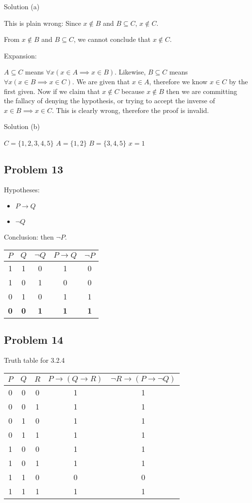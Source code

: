 \documentclass{article}
\begin{document}
Solution (a)

This is plain wrong: Since $x \notin B$ and $B \subseteq C$, $x \notin
C$.

From $x \notin B$ and $B \subseteq C$, we cannot conclude that $x
\notin C$.

Expansion:

$A \subseteq C$ means $\forall x ( x \in A \implies x \in B )$. Likewise,
$B \subseteq C$ means $\forall x ( x \in B \implies x \in C )$. We are given
that $x \in A$, therefore we know $x \in C$ by the first given. Now if we
claim that $x \notin C$ because $x \notin B$ then we are committing the 
fallacy of denying the hypothesis, or trying to accept the inverse of
$x \in B \implies x \in C$. This is clearly wrong, therefore the proof
is invalid.

Solution (b)

$ C = \{1,2,3,4,5\} $
$ A = \{1,2\}$
$ B = \{3,4,5\}$
$ x = 1 $

\subsection{Problem 13}
Hypotheses:
\begin{itemize}
\item $P \rightarrow Q$
\item $\lnot Q$
\end{itemize}
Conclusion: then $\lnot P$.\\
\begin{table}[h!]
\begin{tabular}{c|c|c|c|c}
$P$ & $Q$ & $\lnot Q$ & $P \rightarrow Q$ & $\lnot P$ \\\hline
1 & 1 & 0 & 1 & 0\\
1 & 0 & 1 & 0 & 0\\
0 & 1 & 0 & 1 & 1\\\hline
\textbf{0} & \textbf{0} & \textbf{1} & \textbf{1} & \textbf{1}\\\hline
\end{tabular}
\end{table}
\newpage
\subsection{Problem 14}
Truth table for 3.2.4
\begin{table}[h!]
\begin{tabular}{c|c|c|c|c}
$P$ & $Q$ & $R$ & $P \rightarrow (Q \rightarrow R)$ & $\lnot R \rightarrow (P \rightarrow \lnot Q)$ \\\hline
0 & 0 & 0 & 1 & 1\\
0 & 0 & 1 & 1 & 1\\
0 & 1 & 0 & 1 & 1\\
0 & 1 & 1 & 1 & 1\\
1 & 0 & 0 & 1 & 1\\
1 & 0 & 1 & 1 & 1\\
1 & 1 & 0 & 0 & 0\\
1 & 1 & 1 & 1 & 1
\end{tabular}
\end{table}
\end{document}
